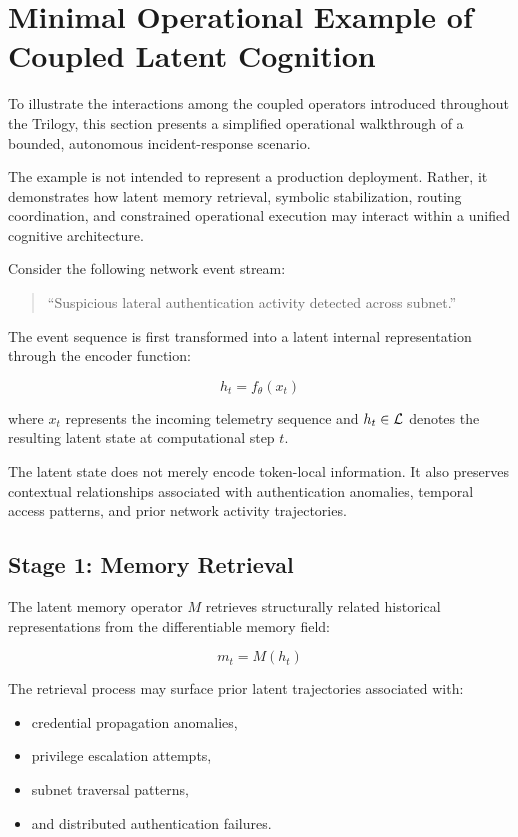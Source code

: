%
\section*{Minimal Operational Example of Coupled Latent Cognition}

To illustrate the interactions among the coupled operators introduced throughout the Trilogy, this section presents a simplified operational walkthrough of a bounded, autonomous incident-response scenario.

The example is not intended to represent a production deployment.
Rather, it demonstrates how latent memory retrieval, symbolic
stabilization, routing coordination, and constrained operational
execution may interact within a unified cognitive architecture.

Consider the following network event stream:

\begin{quote}
``Suspicious lateral authentication activity detected across subnet.''
\end{quote}

The event sequence is first transformed into a latent internal
representation through the encoder function:

\[
h_t = f_\theta(x_t)
\]

where \(x_t\) represents the incoming telemetry sequence and
\(h_t \in \mathcal{L}\) denotes the resulting latent state at
computational step \(t\).

The latent state does not merely encode token-local information. It also preserves contextual relationships associated with authentication anomalies, temporal access patterns, and prior network activity trajectories.

\subsection*{Stage 1: Memory Retrieval}

The latent memory operator \(M\) retrieves structurally related historical representations from the differentiable memory field:

\[
m_t = M(h_t)
\]

The retrieval process may surface prior latent trajectories
associated with:

\begin{itemize}
    \item credential propagation anomalies,
    \item privilege escalation attempts,
    \item subnet traversal patterns,
    \item and distributed authentication failures.
\end{itemize}

